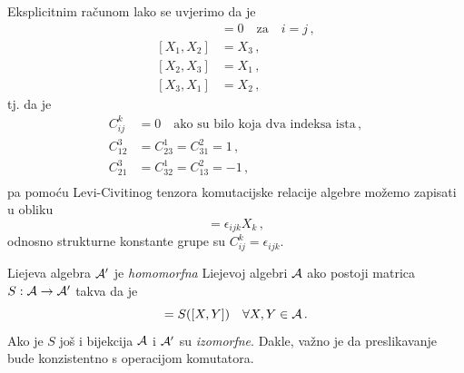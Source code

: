 \begin{primjer}
Eksplicitnim računom lako se uvjerimo da je
 \begin{align}
     [X_i,X_j]& =0 \quad\text{za}\quad i=j \,,  \\
     [X_1,X_2]& = X_3 \,, \\
     [X_2,X_3]& = X_1  \,, \\
     [X_3,X_1]& = X_2 \,,
 \end{align}
tj. da je
\begin{align}
 C_{ij}^{k}& = 0 \quad\text{ako su bilo koja dva indeksa ista} \,, \\
 C_{12}^3  & = C_{23}^{1}=C_{31}^{2}=1 \,, \\
 C_{21}^3  & = C_{32}^{1}=C_{13}^{2}=-1 \,, \\
 \end{align}
pa pomoću Levi-Civitinog tenzora
komutacijske relacije algebre  možemo zapisati u obliku
\begin{equation}
 [X_i, X_j]=\epsilon_{ijk} X_k  \,,
  \label{eq:algebraso3}
\end{equation}
odnosno strukturne konstante grupe  su $C_{ij}^{k} = \epsilon_{ijk}$.
\end{primjer}


Liejeva algebra $\mathcal{A}'$ je \emph{homomorfna} Liejevoj algebri $\mathcal{A}$ ako postoji 
matrica $S:\mathcal{A}\to\mathcal{A}'$ takva da je
\begin{displaymath}
       [S(X), S(Y)]=S([X,Y]) \quad \forall X, Y \in\calA \,.
\end{displaymath}
Ako je $S$ još i bijekcija $\mathcal{A}$ i $\mathcal{A}'$ su \emph{izomorfne}. Dakle,
važno je da preslikavanje  bude konzistentno s operacijom komutatora.

